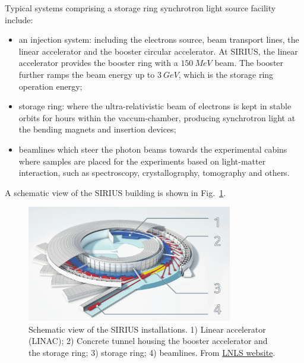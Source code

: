 Typical systems comprising a storage ring synchrotron light source facility include:
\begin{itemize}
    \item an injection system: including the electrons source, beam transport lines, the linear accelerator and the booster circular accelerator. At SIRIUS, the linear accelerator provides the booster ring with a $150~\unit{MeV}$ beam. The booster further ramps the beam energy up to $3~\unit{GeV}$, which is the storage ring operation energy;
    \item storage ring: where the ultra-relativistic beam of electrons is kept in stable orbits for hours within the vaccum-chamber, producing synchrotron light at the bending magnets and insertion devices;
    \item beamlines which steer the photon beams towards the experimental cabins where samples are placed for the experiments based on light-matter interaction, such as spectroscopy, crystallography, tomography and others.
\end{itemize}
A schematic view of the SIRIUS building is shown in Fig.~\ref{fig:sirius_layout}.
\begin{figure}[t]
    \centering
    \includegraphics[width=0.8\textwidth]{Images/sirius_facility.png}
    \caption{Schematic view of the SIRIUS installations. 1) Linear accelerator (LINAC); 2) Concrete tunnel housing the booster accelerator and the storage ring; 3) storage ring; 4) beamlines. From \href{https://lnls.cnpem.br/sirius/como-funciona-o-sirius/}{LNLS website}.}
    \label{fig:sirius_layout}
\end{figure}
